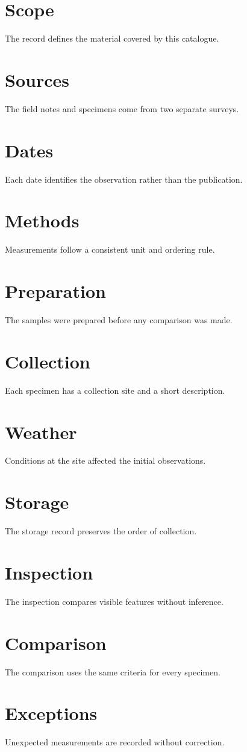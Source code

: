 \documentclass{article}
\begin{document}
\tableofcontents
\section{Scope}
The record defines the material covered by this catalogue.
\section{Sources}
The field notes and specimens come from two separate surveys.
\section{Dates}
Each date identifies the observation rather than the publication.
\section{Methods}
Measurements follow a consistent unit and ordering rule.
\section{Preparation}
The samples were prepared before any comparison was made.
\section{Collection}
Each specimen has a collection site and a short description.
\section{Weather}
Conditions at the site affected the initial observations.
\section{Storage}
The storage record preserves the order of collection.
\section{Inspection}
The inspection compares visible features without inference.
\section{Comparison}
The comparison uses the same criteria for every specimen.
\section{Exceptions}
Unexpected measurements are recorded without correction.
\end{document}
